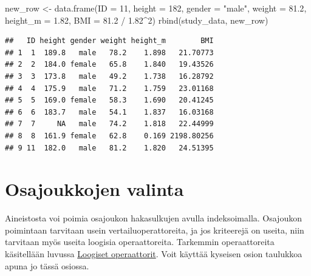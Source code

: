 \documentclass[
]{book}
\newenvironment{Shaded}{\begin{snugshade}}{\end{snugshade}}
\newcommand{\AttributeTok}[1]{\textcolor[rgb]{0.77,0.63,0.00}{#1}}
\newcommand{\CommentTok}[1]{\textcolor[rgb]{0.56,0.35,0.01}{\textit{#1}}}
\newcommand{\DecValTok}[1]{\textcolor[rgb]{0.00,0.00,0.81}{#1}}
\newcommand{\FloatTok}[1]{\textcolor[rgb]{0.00,0.00,0.81}{#1}}
\newcommand{\FunctionTok}[1]{\textcolor[rgb]{0.00,0.00,0.00}{#1}}
\newcommand{\NormalTok}[1]{#1}
\newcommand{\OtherTok}[1]{\textcolor[rgb]{0.56,0.35,0.01}{#1}}
\newcommand{\SpecialCharTok}[1]{\textcolor[rgb]{0.00,0.00,0.00}{#1}}
\newcommand{\StringTok}[1]{\textcolor[rgb]{0.31,0.60,0.02}{#1}}
\begin{document}
\begin{Shaded}
\begin{Highlighting}[]
\NormalTok{new\_row }\OtherTok{\textless{}{-}} \FunctionTok{data.frame}\NormalTok{(}\AttributeTok{ID =} \DecValTok{11}\NormalTok{, }\AttributeTok{height =} \DecValTok{182}\NormalTok{, }\AttributeTok{gender =} \StringTok{"male"}\NormalTok{, }
                      \AttributeTok{weight =} \FloatTok{81.2}\NormalTok{, }\AttributeTok{height\_m =} \FloatTok{1.82}\NormalTok{, }\AttributeTok{BMI =} \FloatTok{81.2} \SpecialCharTok{/} \FloatTok{1.82}\SpecialCharTok{\^{}}\DecValTok{2}\NormalTok{)}
\FunctionTok{rbind}\NormalTok{(study\_data, new\_row)}
\end{Highlighting}
\end{Shaded}

\begin{verbatim}
##   ID height gender weight height_m        BMI
## 1  1  189.8   male   78.2    1.898   21.70773
## 2  2  184.0 female   65.8    1.840   19.43526
## 3  3  173.8   male   49.2    1.738   16.28792
## 4  4  175.9   male   71.2    1.759   23.01168
## 5  5  169.0 female   58.3    1.690   20.41245
## 6  6  183.7   male   54.1    1.837   16.03168
## 7  7     NA   male   74.2    1.818   22.44999
## 8  8  161.9 female   62.8    0.169 2198.80256
## 9 11  182.0   male   81.2    1.820   24.51395
\end{verbatim}

\hypertarget{osajoukkojen-valinta}{%
\section{Osajoukkojen valinta}\label{osajoukkojen-valinta}}

Aineistosta voi poimia osajoukon hakasulkujen avulla indeksoimalla. Osajoukon poimintaan tarvitaan usein vertailuoperattoreita, ja jos kriteerejä on useita, niin tarvitaan myös useita loogisia operaattoreita. Tarkemmin operaattoreita käsitellään luvussa \protect\hyperlink{loogiset-operaattorit}{Loogiset operaattorit}. Voit käyttää kyseisen osion taulukkoa apuna jo tässä osiossa.

\begin{Shaded}
\end{Shaded}
\end{document}
